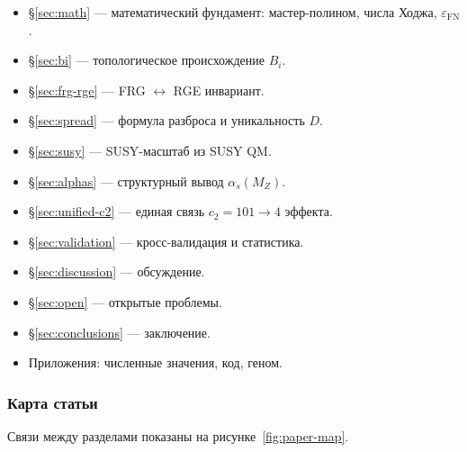 \documentclass[11pt,a4paper]{article}
\newcommand{\epsFN}{\ensuremath{\varepsilon_{\text{FN}}}}
\theoremstyle{definition}
\begin{document}
\begin{itemize}
    \item \S\ref{sec:math} --- математический фундамент:
          мастер-полином, числа Ходжа, $\epsFN$.
    \item \S\ref{sec:bi} --- топологическое происхождение $B_i$.
    \item \S\ref{sec:frg-rge} --- FRG $\leftrightarrow$ RGE инвариант.
    \item \S\ref{sec:spread} --- формула разброса и уникальность $D$.
    \item \S\ref{sec:susy} --- SUSY-масштаб из SUSY QM.
    \item \S\ref{sec:alphas} --- структурный вывод $\alpha_s(M_Z)$.
    \item \S\ref{sec:unified-c2} --- единая связь $c_2 = 101
          \to 4$ эффекта.
    \item \S\ref{sec:validation} --- кросс-валидация и статистика.
    \item \S\ref{sec:discussion} --- обсуждение.
    \item \S\ref{sec:open} --- открытые проблемы.
    \item \S\ref{sec:conclusions} --- заключение.
    \item Приложения: численные значения, код, геном.
\end{itemize}

\subsubsection{Карта статьи}
\label{subsubsec:paper-map}

Связи между разделами показаны на рисунке~\ref{fig:paper-map}.
\end{document}
